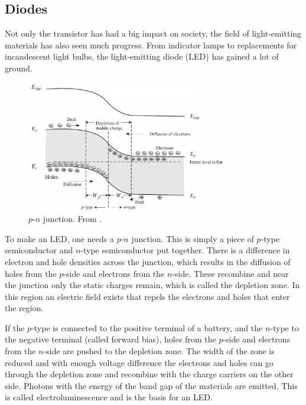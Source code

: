 \subsection{Diodes}
Not only the transistor has had a big impact on society, the field of light-emitting materials has also seen much progress. From indicator lamps to replacements for incandescent light bulbs, the light-emitting diode (LED) has gained a lot of ground.

\begin{figure}[!ht]
 \begin{center}
  \includegraphics[width=0.8\textwidth]{pn_junction}
  \caption{$p$-$n$ junction. From \citet{vanweesbook}.}
  \label{fig:pn_junction}
 \end{center}
\end{figure}

To make an LED, one needs a $p$-$n$ junction. This is simply a piece of $p$-type semiconductor and $n$-type semiconductor put together. There is a difference in electron and hole densities across the junction, which results in the diffusion of holes from the $p$-side and electrons from the $n$-side. These recombine and near the junction only the static charges remain, which is called the depletion zone. In this region an electric field exists that repels the electrons and holes that enter the region.

If the $p$-type is connected to the positive terminal of a battery, and the $n$-type to the negative terminal (called forward bias), holes from the $p$-side and electrons from the $n$-side are pushed to the depletion zone. The width of the zone is reduced and with enough voltage difference the electrons and holes can go through the depletion zone and recombine with the charge carriers on the other side. Photons with the energy of the band gap of the materials are emitted. This is called electroluminescence and is the basis for an LED.

